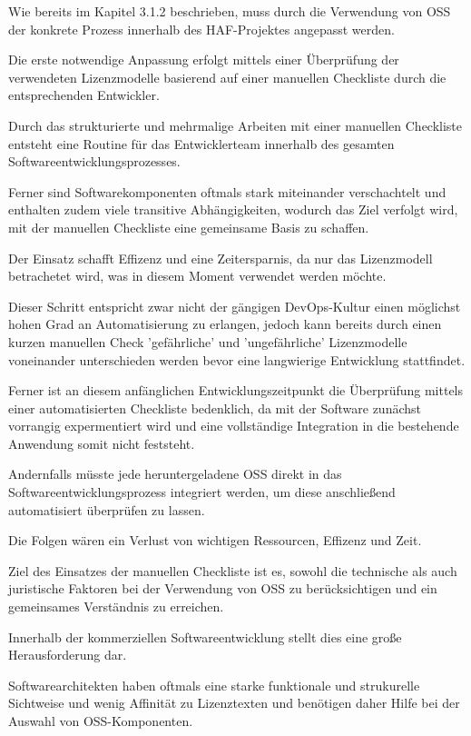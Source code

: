 Wie bereits im Kapitel 3.1.2 beschrieben, muss durch die Verwendung von OSS der konkrete Prozess innerhalb des HAF-Projektes angepasst werden. 

Die erste notwendige Anpassung erfolgt mittels einer Überprüfung der verwendeten Lizenzmodelle basierend auf einer manuellen Checkliste durch die entsprechenden Entwickler.  

Durch das strukturierte und mehrmalige Arbeiten mit einer manuellen Checkliste entsteht eine Routine für das Entwicklerteam innerhalb des gesamten Softwareentwicklungsprozesses.

Ferner sind Softwarekomponenten oftmals stark miteinander verschachtelt und enthalten zudem viele transitive Abhängigkeiten, wodurch das Ziel verfolgt wird, mit der manuellen Checkliste eine gemeinsame Basis zu schaffen.

Der Einsatz schafft Effizenz und eine Zeitersparnis, da nur das Lizenzmodell betrachetet wird, was in diesem Moment verwendet werden möchte.  

Dieser Schritt entspricht zwar nicht der gängigen DevOps-Kultur einen möglichst hohen Grad an Automatisierung zu erlangen, jedoch kann bereits durch einen kurzen manuellen Check 'gefährliche' und 'ungefährliche' Lizenzmodelle voneinander unterschieden werden bevor eine langwierige Entwicklung stattfindet. 

Ferner ist an diesem anfänglichen Entwicklungszeitpunkt die Überprüfung mittels einer automatisierten Checkliste bedenklich, da mit der Software zunächst vorrangig expermentiert wird und eine vollständige Integration in die bestehende Anwendung somit nicht feststeht.

Andernfalls müsste jede heruntergeladene OSS direkt in das Softwareentwicklungsprozess integriert werden, um diese anschließend automatisiert überprüfen zu lassen.

Die Folgen wären ein Verlust von wichtigen Ressourcen, Effizenz und Zeit.

Ziel des Einsatzes der manuellen Checkliste ist es, sowohl die technische als auch juristische Faktoren bei der Verwendung von OSS zu berücksichtigen und ein gemeinsames Verständnis zu erreichen.

Innerhalb der kommerziellen Softwareentwicklung stellt dies eine große Herausforderung dar.

Softwarearchitekten haben oftmals eine starke funktionale und strukurelle Sichtweise und wenig Affinität zu Lizenztexten und benötigen daher Hilfe bei der Auswahl von OSS-Komponenten. 

